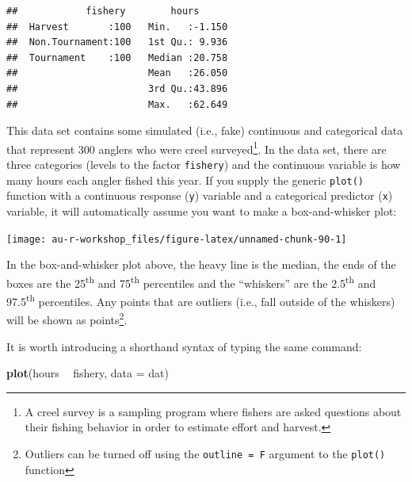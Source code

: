 \documentclass[]{book}
\newenvironment{Shaded}{\begin{snugshade}}{\end{snugshade}}
\newcommand{\KeywordTok}[1]{\textcolor[rgb]{0.13,0.29,0.53}{\textbf{#1}}}
\newcommand{\DataTypeTok}[1]{\textcolor[rgb]{0.13,0.29,0.53}{#1}}
\newcommand{\StringTok}[1]{\textcolor[rgb]{0.31,0.60,0.02}{#1}}
\newcommand{\OperatorTok}[1]{\textcolor[rgb]{0.81,0.36,0.00}{\textbf{#1}}}
\newcommand{\NormalTok}[1]{#1}
\let\rmarkdownfootnote\footnote%
\def\footnote{\protect\rmarkdownfootnote}
\theoremstyle{definition}
\theoremstyle{definition}
\theoremstyle{definition}
\theoremstyle{remark}
\begin{document}
\begin{verbatim}
##            fishery        hours       
##  Harvest       :100   Min.   :-1.150  
##  Non.Tournament:100   1st Qu.: 9.936  
##  Tournament    :100   Median :20.758  
##                       Mean   :26.050  
##                       3rd Qu.:43.896  
##                       Max.   :62.649
\end{verbatim}

This data set contains some simulated (i.e., fake) continuous and
categorical data that represent 300 anglers who were creel
surveyed\footnote{A creel survey is a sampling program where fishers are
  asked questions about their fishing behavior in order to estimate
  effort and harvest.}. In the data set, there are three categories
(levels to the factor \texttt{fishery}) and the continuous variable is
how many hours each angler fished this year. If you supply the generic
\texttt{plot()} function with a continuous response (\texttt{y})
variable and a categorical predictor (\texttt{x}) variable, it will
automatically assume you want to make a box-and-whisker plot:

\begin{Shaded}
\end{Shaded}

\begin{center}\texttt{[image: au-r-workshop\_files/figure-latex/unnamed-chunk-90-1]} \end{center}

In the box-and-whisker plot above, the heavy line is the median, the
ends of the boxes are the 25\textsuperscript{th} and
75\textsuperscript{th} percentiles and the ``whiskers'' are the
2.5\textsuperscript{th} and 97.5\textsuperscript{th} percentiles. Any
points that are outliers (i.e., fall outside of the whiskers) will be
shown as points\footnote{Outliers can be turned off using the
  \texttt{outline\ =\ F} argument to the \texttt{plot()} function}.

It is worth introducing a shorthand syntax of typing the same command:

\begin{Shaded}
\begin{Highlighting}[]
\KeywordTok{plot}\NormalTok{(hours }\OperatorTok{~}\StringTok{ }\NormalTok{fishery, }\DataTypeTok{data =}\NormalTok{ dat)}
\end{Highlighting}
\end{Shaded}
\end{document}
